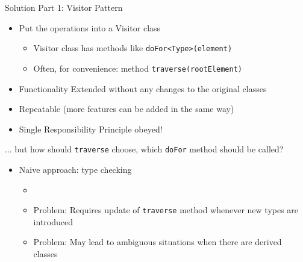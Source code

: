 
\begin{frame}{Solution Part 1: Visitor Pattern}
%
\begin{itemize}
\item Put the operations into a Visitor class
	\begin{itemize}
	\item Visitor class has methods like \texttt{doFor<Type>(element)}
	\item Often, for convenience: method \texttt{traverse(rootElement)}
	\end{itemize}
\item[\Thus] Functionality Extended without any changes to the original classes
\item[\Thus] Repeatable (more features can be added in the same way)
\item[\Thus] Single Responsibility Principle obeyed!
\pause
\end{itemize}

\vspace{6pt}
... but how should \texttt{traverse} choose, which \texttt{doFor} method should be called?
\begin{itemize}
\item Naive approach: type checking
	\begin{itemize}
	\item {}
	\item Problem: Requires update of \texttt{traverse} method whenever new types are introduced
	\item Problem: May lead to ambiguous situations when there are derived classes
	\end{itemize}
\end{itemize}
%
\end{frame}



